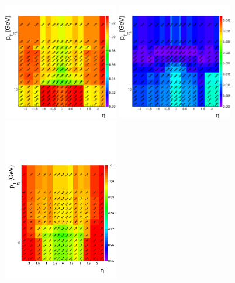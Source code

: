 \begin{figure}[htbp]
  \begin{center}
		\includegraphics[width=0.45\textwidth]{Figures/Muons/2016_SF_legacy_newLoose.png}
    \includegraphics[width=0.45\textwidth]{Figures/Muons/2016_SF_errors_legacy_newLoose.png} \\
		\includegraphics[width=0.45\textwidth]{Figures/Muons/2017UL_SFs.pdf}

\end{center}
\end{figure}
